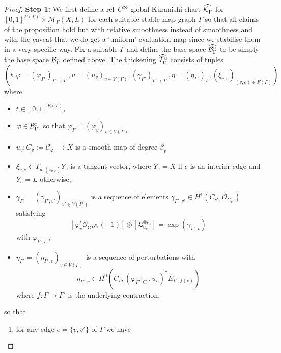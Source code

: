 \documentclass[11pt,psamsfonts, oneside, reqno]{amsart}
\newcommand{\cl}{\colon}
\newcommand{\Mbar}{\overline{\mathcal M}}
\newcommand{\bC}{\mathbb{C}}
\newcommand{\cB}{\mathcal{B}}
\newcommand{\cC}{\mathcal{C}}
\newcommand{\cK}{\mathcal{K}}
\newcommand{\cO}{\mathcal{O}}
\newcommand{\cT}{\mathcal{T}}
\newcommand{\fL}{\mathfrak{L}}
\newcommand{\wh}{\widehat}
\newcommand{\cKc}{\cK^{\scale{\square}{0.6}}}
\newcommand{\scale}[2]{\scaleobj{#2}{#1}}
\newcommand{\cBc}{\cB^{\scale{\square}{0.6}}}
\newcommand{\cTc}{\cT^{\scale{\square}{0.6}}}
\theoremstyle{definition}
\theoremstyle{remark}
\numberwithin{equation}{section}
\begin{document}
\begin{proof}
	\noindent\textbf{Step 1:} We first define a rel--$C^\infty$ global Kuranishi chart $\wh{\cKc_\Gamma}$ for $[0,1]^{E(\Gamma)}\times \Mbar_\Gamma(X,L)$ for each suitable stable map graph $\Gamma$ so that all claims of the proposition hold but with relative smoothness instead of smoothness and with the caveat that we do get a `uniform' evaluation map since we stabilise them in a very specific way. Fix a suitable $\Gamma$ and define the base space $\wh{\cBc_\Gamma}$ to be simply the base space $\cBc_\Gamma$ defined above. The thickening $\wh{\cTc_\Gamma}$ consists of tuples 
	\begin{equation}\label{eq:point-in-cubical-cobordism}
		(t,\varphi= (\varphi_{\Gamma'})_{\Gamma\to \Gamma'},u = (u_v)_{v\in V(\Gamma)},(\gamma_{\Gamma'})_{\Gamma\to \Gamma'},\eta = (\eta_{\Gamma'})_\Gamma,(\xi_{v,e})_{(v,e)\in F(\Gamma)})
	\end{equation}
	where 
	\begin{itemize}[leftmargin=20pt]
		\item $t\in [0,1]^{E(\Gamma)}$,
		\item $\varphi\in \cBc_\Gamma$, so that $\varphi_\Gamma = (\varphi_v)_{v\in V(\Gamma)}$
		\item $u_v \cl C_v:=\cC_{\varphi_v}\to X$ is a smooth map of degree $\beta_v$
		\item $\xi_{v,e}\in T_{u_v(z_{v,e})}Y_e$ is a tangent vector, where $Y_e = X$ if $e$ is an interior edge and $Y_e = L$ otherwise,
		\item $\gamma_{\Gamma'} =(\gamma_{\Gamma',v'})_{v'\in V(\Gamma')}$ is a sequence of elements $\gamma_{\Gamma',v'}\in H^1(C_{v'},\cO_{C_{v'}})$ satisfying
			\begin{equation*}\label{eq:line-bundle-matchup} [\varphi_v^*\cO_{\bC P^{N_v}}(-1)]\otimes [\fL_{u_v}^{\otimes p_v}] = \exp(\gamma_{\Gamma',v})\end{equation*} 
			with $\varphi_{\Gamma',v'}$,
		\item $\eta_{\Gamma'} = (\eta_{\Gamma',v})_{v\in V(\Gamma)}$ is a sequence of perturbations with 
		\[\eta_{\Gamma',v} \in H^0(C_v,(\varphi_{\Gamma'}|_{C_v},u_v)^*E_{\Gamma',f(v)}) \] where $f \cl \Gamma\to \Gamma'$ is the underlying contraction, 
	\end{itemize}
 so that 
 \begin{enumerate}[label=\roman*),leftmargin=23pt,ref=\roman*]
 	\item  for any edge $e = \{v,v'\}$ of $\Gamma$ we have
 	\begin{equation*}\label{eq:almost-agreeing-maps} 

\end{equation*}
\end{enumerate}
\end{proof}
\end{document}
